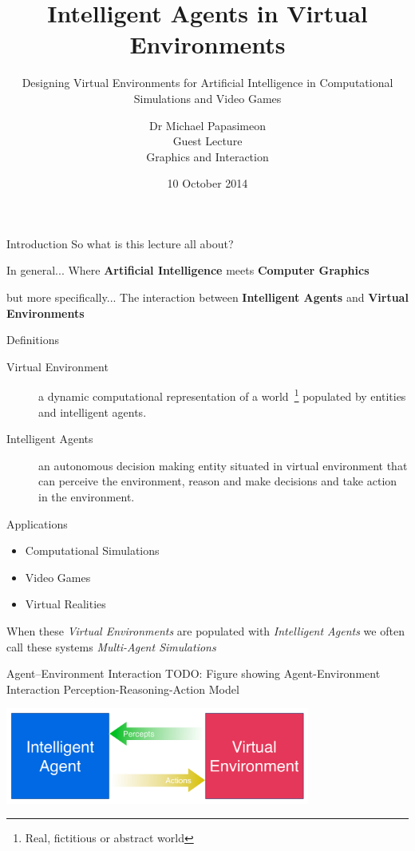 \documentclass[xcolor=dvipsnames,t]{beamer}
\title[Intelligent Agents in Virtual Environments]{Intelligent Agents in Virtual Environments}
\subtitle{Designing Virtual Environments for Artificial Intelligence in
Computational Simulations and Video Games}
\author[Michael Papasimeon]{Dr Michael Papasimeon \\[0.2in] 
                Guest Lecture\\
                Graphics and Interaction\\}
\date{10 October 2014}
\begin{document}
\begin{frame}
    \titlepage
\end{frame} 

\begin{frame}{Introduction} 
So what is this lecture all about? \\[1cm] 
\begin{block}{In general...}   
Where \textbf{Artificial Intelligence} meets \textbf{Computer Graphics}
\end{block} 
\pause
\begin{block}{but more specifically...} 
The interaction between \textbf{Intelligent Agents} and \textbf{Virtual Environments}
\end{block} 
\end{frame} 

\begin{frame}{Definitions} 
    \begin{description}
        \item[Virtual Environment] a dynamic computational representation of a
        world~\footnote{Real, fictitious or abstract world} 
        populated by entities and intelligent agents. 
        \item[Intelligent Agents] an autonomous decision making entity situated
        in virtual environment that can perceive the environment, reason and
        make decisions and take action in the environment.  
    \end{description} 
\end{frame} 

\begin{frame}{Applications} 
\begin{itemize} 
    \item Computational Simulations
    \item Video Games
    \item Virtual Realities
\end{itemize} 
\vspace{0.5in} 
When these \emph{Virtual Environments} are populated with \emph{Intelligent
Agents} we often call these systems \emph{Multi-Agent Simulations} 
\end{frame} 

\begin{frame}{Agent--Environment Interaction} 
TODO: Figure showing Agent-Environment Interaction
Perception-Reasoning-Action Model 
\begin{center}
\includegraphics[width=10cm]{agent-env} 
\end{center} 
\end{frame} 
\end{document}

